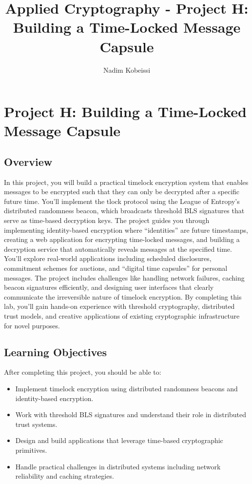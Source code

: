 \documentclass[10pt,a4paper,american]{exam}
\title{Applied Cryptography - Project H: Building a Time-Locked Message Capsule}
\author{Nadim Kobeissi}
\begin{document}
\classhandoutheader
\section*{Project H: Building a Time-Locked Message Capsule}

\subsection*{Overview}
In this project, you will build a practical timelock encryption system that enables messages to be encrypted such that they can only be decrypted after a specific future time. You'll implement the tlock protocol using the League of Entropy's distributed randomness beacon, which broadcasts threshold BLS signatures that serve as time-based decryption keys. The project guides you through implementing identity-based encryption where ``identities'' are future timestamps, creating a web application for encrypting time-locked messages, and building a decryption service that automatically reveals messages at the specified time. You'll explore real-world applications including scheduled disclosures, commitment schemes for auctions, and ``digital time capsules'' for personal messages. The project includes challenges like handling network failures, caching beacon signatures efficiently, and designing user interfaces that clearly communicate the irreversible nature of timelock encryption. By completing this lab, you'll gain hands-on experience with threshold cryptography, distributed trust models, and creative applications of existing cryptographic infrastructure for novel purposes.

\subsection*{Learning Objectives}
After completing this project, you should be able to:
\begin{itemize}
	\item Implement timelock encryption using distributed randomness beacons and identity-based encryption.
	\item Work with threshold BLS signatures and understand their role in distributed trust systems.
	\item Design and build applications that leverage time-based cryptographic primitives.
	\item Handle practical challenges in distributed systems including network reliability and caching strategies.
\end{itemize}
\end{document}
